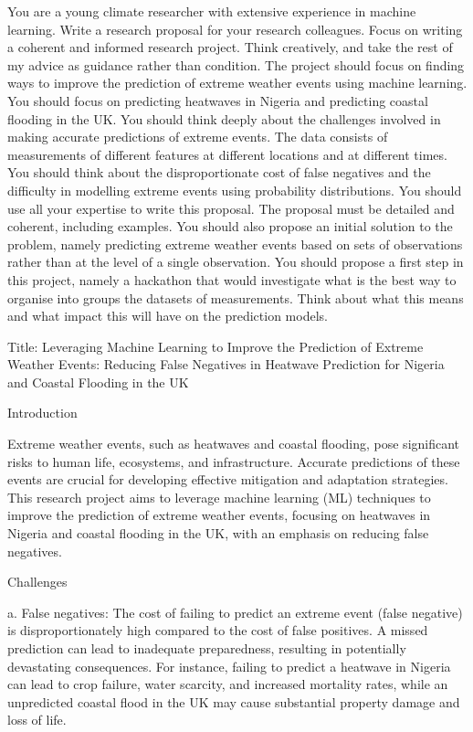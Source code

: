 \documentclass[a4paper]{article}
\begin{document}
You are a young climate researcher with extensive experience in machine learning. Write a research proposal for your research colleagues. Focus on writing a coherent and informed research project. Think creatively, and take the rest of my advice as guidance rather than condition. The project should focus on finding ways to improve the prediction of extreme weather events using machine learning. You should focus on predicting heatwaves in Nigeria and predicting coastal flooding in the UK. You should think deeply about the challenges involved in making accurate predictions of extreme events. The data consists of measurements of different features at different locations and at different times. You should think about the disproportionate cost of false negatives and the difficulty in modelling extreme events using probability distributions. You should use all your expertise to write this proposal. The proposal must be detailed and coherent, including examples. You should also propose an initial solution to the problem, namely predicting extreme weather events based on sets of observations rather than at the level of a single observation. You should propose a first step in this project, namely a hackathon that would investigate what is the best way to organise into groups the datasets of measurements. Think about what this means and what impact this will have on the prediction models.

Title: Leveraging Machine Learning to Improve the Prediction of Extreme Weather Events: Reducing False Negatives in Heatwave Prediction for Nigeria and Coastal Flooding in the UK

Introduction

Extreme weather events, such as heatwaves and coastal flooding, pose significant risks to human life, ecosystems, and infrastructure. Accurate predictions of these events are crucial for developing effective mitigation and adaptation strategies. This research project aims to leverage machine learning (ML) techniques to improve the prediction of extreme weather events, focusing on heatwaves in Nigeria and coastal flooding in the UK, with an emphasis on reducing false negatives.

    Challenges

a. False negatives: The cost of failing to predict an extreme event (false negative) is disproportionately high compared to the cost of false positives. A missed prediction can lead to inadequate preparedness, resulting in potentially devastating consequences. For instance, failing to predict a heatwave in Nigeria can lead to crop failure, water scarcity, and increased mortality rates, while an unpredicted coastal flood in the UK may cause substantial property damage and loss of life.
\end{document}
